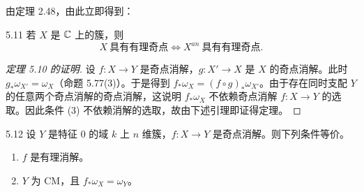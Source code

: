 
由定理 2.48，由此立即得到：

\begin{corollary}{5.11}
若 $X$ 是 $\mathbb{C}$ 上的簇，则
\[
X\ \text{具有有理奇点}\iff X^{an}\ \text{具有有理奇点}.
\]
\end{corollary}

\begin{proof}[定理 5.10 的证明]
设 $f\colon X\to Y$ 是奇点消解，$g\colon X'\to X$ 是 $X$ 的奇点消解。此时 $g_*\omega_{X'}=\omega_X$（命题 5.77(3)）。于是得到 $f_*\omega_X=(f\circ g)_*\omega_{X'}$。由于存在同时支配 $Y$ 的任意两个奇点消解的奇点消解，这说明 $f_*\omega_X$ 不依赖奇点消解 $f\colon X\to Y$ 的选取。因此条件 (3) 不依赖消解的选取，故由下述引理即证得定理。
\end{proof}

\begin{lemmap}{5.12}
设 $Y$ 是特征 $0$ 的域 $k$ 上 $n$ 维簇，$f\colon X\to Y$ 是奇点消解。则下列条件等价。
\begin{enumerate}[label=(\arabic*),leftmargin=*]
\item $f$ 是有理消解。
\item $Y$ 为 CM，且 $f_*\omega_X=\omega_Y$。
\end{enumerate}
\end{lemmap}

